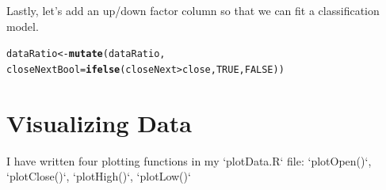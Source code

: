 \documentclass{article}\usepackage[]{graphicx}\usepackage[]{color}
\makeatletter
\newcommand{\hlnum}[1]{\textcolor[rgb]{0.686,0.059,0.569}{#1}}%
\newcommand{\hlopt}[1]{\textcolor[rgb]{0,0,0}{#1}}%
\newcommand{\hlstd}[1]{\textcolor[rgb]{0.345,0.345,0.345}{#1}}%
\newcommand{\hlkwb}[1]{\textcolor[rgb]{0.69,0.353,0.396}{#1}}%
\newcommand{\hlkwc}[1]{\textcolor[rgb]{0.333,0.667,0.333}{#1}}%
\newcommand{\hlkwd}[1]{\textcolor[rgb]{0.737,0.353,0.396}{\textbf{#1}}}%
\newenvironment{kframe}{%
 \def\at@end@of@kframe{}%
 \ifinner\ifhmode%
  \def\at@end@of@kframe{\end{minipage}}%
  \begin{minipage}{\columnwidth}%
 \fi\fi%
 \def\FrameCommand##1{\hskip\@totalleftmargin \hskip-\fboxsep
 \colorbox{shadecolor}{##1}\hskip-\fboxsep
     \hskip-\linewidth \hskip-\@totalleftmargin \hskip\columnwidth}%
 \MakeFramed {\advance\hsize-\width
   \@totalleftmargin\z@ \linewidth\hsize
   \@setminipage}}%
 {\par\unskip\endMakeFramed%
 \at@end@of@kframe}
\newenvironment{knitrout}{}{} %
\makeatother
\begin{document}
Lastly, let's add an up/down factor column so that we can fit a classification model.
\begin{knitrout}
\color{fgcolor}\begin{kframe}
\begin{alltt}
\hlstd{dataRatio} \hlkwb{<-} \hlkwd{mutate}\hlstd{(dataRatio,}
              \hlkwc{closeNextBool}\hlstd{=}\hlkwd{ifelse}\hlstd{(closeNext}\hlopt{>}\hlstd{close,}\hlnum{TRUE}\hlstd{,}\hlnum{FALSE}\hlstd{))}
\end{alltt}
\end{kframe}
\end{knitrout}

\section{Visualizing Data}
I have written four plotting functions in my `plotData.R` file:
`plotOpen()`, `plotClose()`, `plotHigh()`, `plotLow()`





\begin{figure}[ht]
\begin{center}
\qquad
{}
\end{center}
\end{figure}
\end{document}
